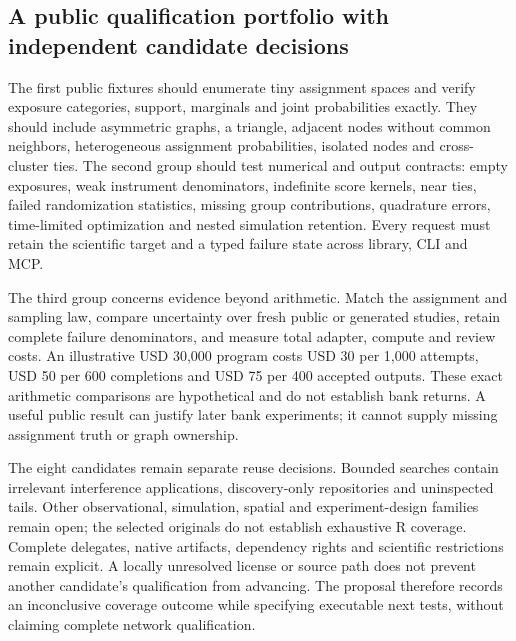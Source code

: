 \subsection{A public qualification portfolio with independent candidate decisions}

The first public fixtures should enumerate tiny assignment spaces and verify exposure categories, support, marginals and joint probabilities exactly. They should include asymmetric graphs, a triangle, adjacent nodes without common neighbors, heterogeneous assignment probabilities, isolated nodes and cross-cluster ties. The second group should test numerical and output contracts: empty exposures, weak instrument denominators, indefinite score kernels, near ties, failed randomization statistics, missing group contributions, quadrature errors, time-limited optimization and nested simulation retention. Every request must retain the scientific target and a typed failure state across library, CLI and MCP.~\citep{exec25_rnet_choice}

The third group concerns evidence beyond arithmetic. Match the assignment and sampling law, compare uncertainty over fresh public or generated studies, retain complete failure denominators, and measure total adapter, compute and review costs. An illustrative USD 30,000 program costs USD 30 per 1,000 attempts, USD 50 per 600 completions and USD 75 per 400 accepted outputs. These exact arithmetic comparisons are hypothetical and do not establish bank returns. A useful public result can justify later bank experiments; it cannot supply missing assignment truth or graph ownership.~\citep{exec25_rnet_choice}

The eight candidates remain separate reuse decisions. Bounded searches contain irrelevant interference applications, discovery-only repositories and uninspected tails. Other observational, simulation, spatial and experiment-design families remain open; the selected originals do not establish exhaustive R coverage. Complete delegates, native artifacts, dependency rights and scientific restrictions remain explicit. A locally unresolved license or source path does not prevent another candidate's qualification from advancing. The proposal therefore records an inconclusive coverage outcome while specifying executable next tests, without claiming complete network qualification.~\citep{exec25_rnet_choice}
